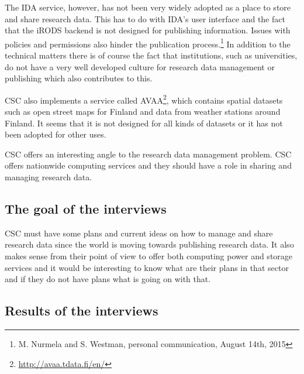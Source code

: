 The IDA service, however, has not been very widely adopted as a place to store
and share research data. This has to do with IDA's user interface and the fact
that the iRODS backend is not designed for publishing information. Issues with
policies and permissions also hinder the publication process.\footnote{M.
Nurmela and S. Westman, personal communication, August 14th, 2015} In addition
to the technical matters there is of course the fact that institutions, such as
universities, do not have a very well developed culture for research data
management or publishing which also contributes to this.

CSC also implements a service called AVAA\footnote{\url{http://avaa.tdata.fi/en/}},
which contains spatial datasets such as open street maps for Finland and data from
weather stations around Finland. It seems that it is not designed for all kinds
of datasets or it has not been adopted for other uses.

\iffalse
CSC offers an interesting angle to the research data management problem. CSC
offers nationwide computing services and they should have a role in sharing and
managing research data.

\subsection{The goal of the interviews}

CSC must have some plans and current ideas on how to manage and share research
data since the world is moving towards publishing research data. It also makes
sense from their point of view to offer both computing power and storage
services and it would be interesting to know what are their plans in that
sector and if they do not have plans what is going on with that.

\subsection{Results of the interviews}

